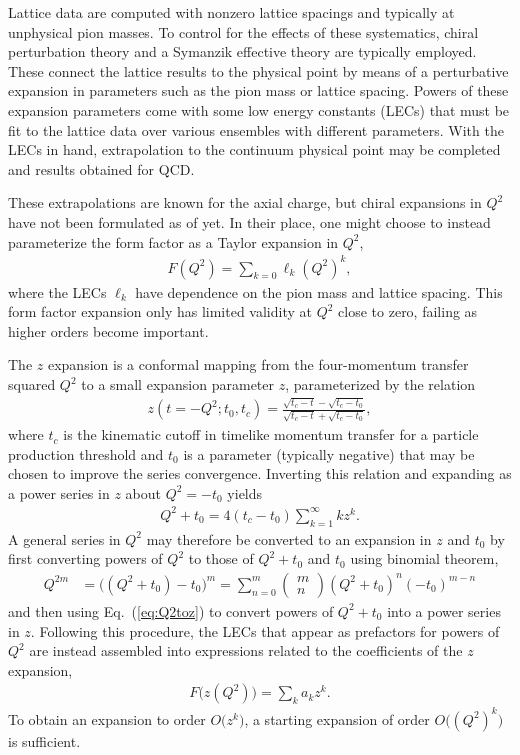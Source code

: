 
Lattice data are computed with nonzero lattice spacings and typically at unphysical pion masses.
To control for the effects of these systematics,
 chiral perturbation theory and a Symanzik effective theory are typically employed.
These connect the lattice results to the physical point by means
 of a perturbative expansion in parameters such as the pion mass or lattice spacing.
Powers of these expansion parameters come with some low energy constants (LECs)
 that must be fit to the lattice data over various ensembles with different parameters.
With the LECs in hand, extrapolation to the continuum physical point
 may be completed and results obtained for QCD.

These extrapolations are known for the axial charge,
 but chiral expansions in $Q^2$ have not been formulated as of yet.
In their place, one might choose to instead parameterize the form factor as
 a Taylor expansion in $Q^2$,
\begin{align}
 F(Q^2) = \sum_{k=0} \ell_k (Q^2)^k,
\end{align}
 where the LECs $\ell_k$ have dependence on the pion mass and lattice spacing.
This form factor expansion only has limited validity at $Q^2$ close to zero,
 failing as higher orders become important.

The $z$ expansion is a conformal mapping from the four-momentum transfer squared $Q^2$
 to a small expansion parameter $z$, parameterized by the relation
\begin{align}
 z(t=-Q^2;t_0,t_c) = \frac{\sqrt{t_c-t} -\sqrt{t_c-t_0}}{ \sqrt{t_c-t} +\sqrt{t_c-t_0}},
\end{align}
 where $t_c$ is the kinematic cutoff in timelike momentum transfer for
 a particle production threshold and $t_0$ is a parameter (typically negative)
 that may be chosen to improve the series convergence.
Inverting this relation and expanding as a power series in $z$ about $Q^2=-t_0$ yields
\begin{align}
 Q^2+t_0 = 4 (t_c-t_0) \sum_{k=1}^\infty k z^k.
 \label{eq:Q2toz}
\end{align}
A general series in $Q^2$ may therefore be converted to an expansion in $z$ and $t_0$
 by first converting powers of $Q^2$ to those of $Q^2+t_0$ and $t_0$ using binomial theorem,
\begin{align}
 Q^{2m} &= \big( (Q^2+t_0) -t_0 \big)^m
 = \sum_{n=0}^{m} \left( \begin{array}{c} m \\ n \end{array} \right) (Q^2+t_0)^n (-t_0)^{m-n}
\end{align}
 and then using Eq.~(\ref{eq:Q2toz}) to convert powers of $Q^2+t_0$ into a power series in $z$.
Following this procedure, the LECs that appear as prefactors for powers of $Q^2$
 are instead assembled into expressions related to the coefficients of the $z$ expansion,
\begin{align}
 F\big(z(Q^2)\big) = \sum_k a_k z^k.
 \label{eq:zexp}
\end{align}
To obtain an expansion to order $O\big(z^{k}\big)$,
 a starting expansion of order $O\big((Q^2)^{k}\big)$ is sufficient.

